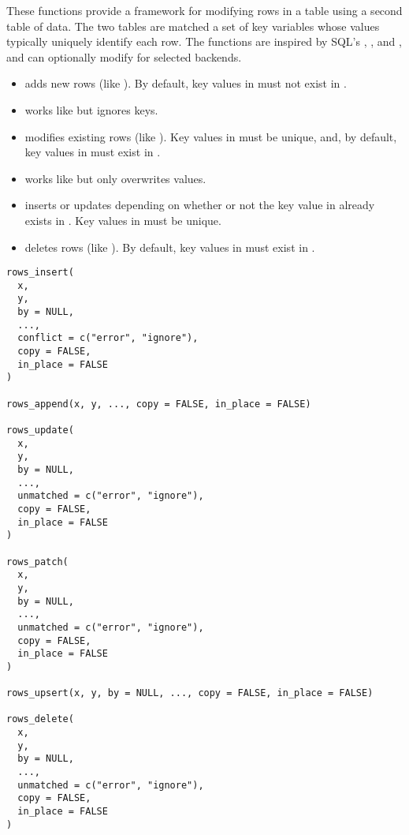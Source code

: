 \documentclass[a4paper]{book}
\begin{document}
\begin{Description}
These functions provide a framework for modifying rows in a table using a
second table of data. The two tables are matched  a set of key variables
whose values typically uniquely identify each row. The functions are inspired
by SQL's , , and , and can optionally modify
 for selected backends.
\begin{itemize}

\item{}  adds new rows (like ). By default, key values in
 must not exist in .
\item{}  works like  but ignores keys.
\item{}  modifies existing rows (like ). Key values in 
must be unique, and, by default, key values in  must exist in .
\item{}  works like  but only overwrites  values.
\item{}  inserts or updates depending on whether or not the
key value in  already exists in . Key values in  must be unique.
\item{}  deletes rows (like ). By default, key values in 
must exist in .

\end{itemize}

\end{Description}
%
\begin{Usage}
\begin{verbatim}
rows_insert(
  x,
  y,
  by = NULL,
  ...,
  conflict = c("error", "ignore"),
  copy = FALSE,
  in_place = FALSE
)

rows_append(x, y, ..., copy = FALSE, in_place = FALSE)

rows_update(
  x,
  y,
  by = NULL,
  ...,
  unmatched = c("error", "ignore"),
  copy = FALSE,
  in_place = FALSE
)

rows_patch(
  x,
  y,
  by = NULL,
  ...,
  unmatched = c("error", "ignore"),
  copy = FALSE,
  in_place = FALSE
)

rows_upsert(x, y, by = NULL, ..., copy = FALSE, in_place = FALSE)

rows_delete(
  x,
  y,
  by = NULL,
  ...,
  unmatched = c("error", "ignore"),
  copy = FALSE,
  in_place = FALSE
)
\end{verbatim}
\end{Usage}
\end{document}
